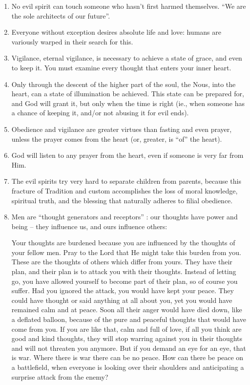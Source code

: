 \begin{enumerate}
\item No evil spirit can touch someone who hasn't first harmed themselves. “We are the sole architects of our future”.

\item Everyone without exception desires absolute life and love: humans are variously warped in their search for this.

\item Vigilance, eternal vigilance, is necessary to achieve a state of grace, and even to keep it. You must examine every thought that enters your inner heart.

\item Only through the descent of the higher part of the soul, the Nous, into the heart, can a state of illumination be achieved. This state can be prepared for, and God will grant it, but only when the time is right (ie., when someone has a chance of keeping it, and/or not abusing it for evil ends).

\item Obedience and vigilance are greater virtues than fasting and even prayer, unless the prayer comes from the heart (or, greater, is “of” the heart).

\item God will listen to any prayer from the heart, even if someone is very far from Him.

\item The evil spirits try very hard to separate children from parents, because this fracture of Tradition and custom accomplishes the loss of moral knowledge, spiritual truth, and the blessing that naturally adheres to filial obedience.

\item Men are “thought generators and receptors” : our thoughts have power and being – they influence us, and ours influence others:

\begin{quotex}
Your thoughts are burdened because you are influenced by the thoughts of your fellow men. Pray to the Lord that He might take this burden from you. These are the thoughts of others which differ from yours. They have their plan, and their plan is to attack you with their thoughts. Instead of letting go, you have allowed yourself to become part of their plan, so of course you suffer.
Had you ignored the attack, you would have kept your peace.
They could have thought or said anything at all about you, yet you would have remained calm and at peace.
Soon all their anger would have died down, like a deflated balloon, because of the pure and peaceful thoughts that would have come from you.
If you are like that, calm and full of love, if all you think are good and kind thoughts, they will stop warring against you in their thoughts and will not threaten you anymore.
But if you demand an eye for an eye, that is war.
Where there is war there can be no peace.
How can there be peace on a battlefield, when everyone is looking over their shoulders and anticipating a surprise attack from the enemy?


\end{quotex}
\end{enumerate}
